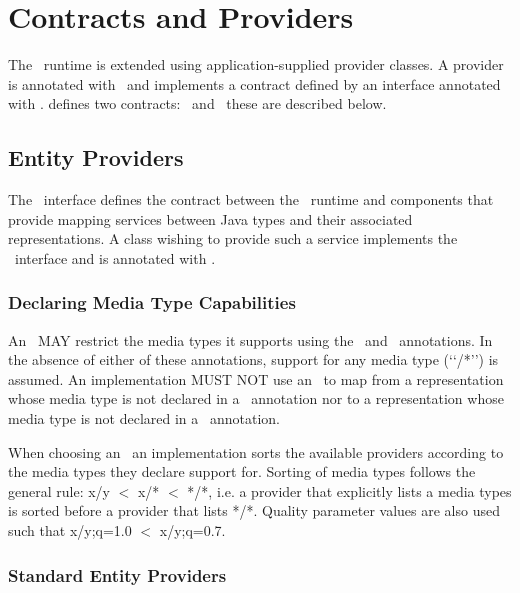 \chapter{Contracts and Providers}

The \jaxrs\ runtime is extended using application-supplied provider classes. A provider is annotated with \Provider\ and implements a contract defined by an interface annotated with \Contract. \jaxrs defines two contracts: \EntityProvider\ and \HeaderProvider\, these are described below.

\section{Entity Providers}
\label{entity_providers}

The \EntityProvider\ interface defines the contract between the \jaxrs\ runtime and components that provide mapping services between Java types and their associated representations. A class wishing to provide such a service implements the \EntityProvider\ interface and is annotated with \Provider.

\subsection{Declaring Media Type Capabilities}
\label{declaring_provider_capabilities}

An \EntityProvider\ MAY restrict the media types it supports using the \ProduceMime\ and \ConsumeMime\ annotations. In the absence of either of these annotations, support for any media type (\lq\lq*/*\rq\rq) is assumed. An implementation MUST NOT use an \EntityProvider\ to map from a representation whose media type is not declared in a \ConsumeMime\ annotation nor to a representation whose media type is not declared in a \ProduceMime\ annotation.

When choosing an \EntityProvider\ an implementation sorts the available providers according to the media types they declare support for. Sorting of media types follows the general rule: x/y $<$ x/* $<$ */*, i.e. a provider that explicitly lists a media types is sorted before a provider that lists */*. Quality parameter values are also used such that x/y;q=1.0 $<$ x/y;q=0.7.

\subsection{Standard Entity Providers}
\label{standard_entity_providers}

